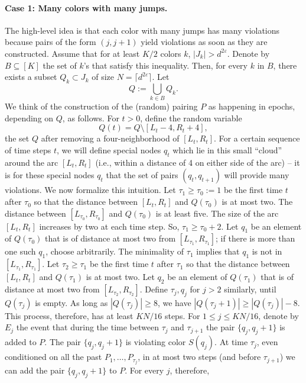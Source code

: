 \documentclass[10pt,a4paper]{article}
\begin{document}
\paragraph{Case 1: Many colors with many jumps.}
The high-level idea is that each color with many jumps has many violations because pairs of the form $(j,j+1)$ yield violations as soon as they are constructed.
Assume that for at least $K/2$ colors $k$, $|J_k|>d^{2\varepsilon}$. Denote by $B\subseteq[K]$ the set of $k$'s that satisfy this inequality. Then, for every $k$ in $B$, there exists a subset $Q_k\subset J_k$ of size $N=\lceil d^{2\varepsilon}\rceil$. Let
\[Q:=\bigcup_{k\in B}Q_k.\]
We think of the construction of the (random) pairing $P$ as happening in epochs, depending on $Q$, as follows.
For $t>0$, define the random variable
\[Q(t)=Q\setminus[L_t-4,R_t+4],\]
the set $Q$ after removing a four-neighborhood of $[L_t,R_t]$. For a certain sequence of time steps $t$, we will define special nodes $q_t$ which lie in this small ``cloud'' around the arc $[L_t,R_t]$ (i.e., within a distance of 4 on either side of the arc) -- it is for these special nodes $q_t$ that the set of pairs $(q_t,q_{t+1})$ will provide many violations. We now formalize this intuition.
Let $\tau_1\geq\tau_0:=1$ be the first time $t$ after $\tau_0$ so that the distance between $[L_t,R_t]$ and $Q(\tau_0)$ is at most two. The distance between $[L_{\tau_0},R_{\tau_0}]$ and $Q(\tau_0)$ is at least five. The size of the arc $[L_t,R_t]$ increases by two at each time step. So, $\tau_1\geq\tau_0+2$. Let $q_1$ be an element of $Q(\tau_0)$ that is of distance at most two from $[L_{\tau_1},R_{\tau_1}]$; if there is more than one such $q_1$, choose arbitrarily. The minimality of $\tau_1$ implies that $q_1$ is not in $[L_{\tau_1},R_{\tau_1}]$.
Let $\tau_2\geq\tau_1$ be the first time $t$ after $\tau_1$ so that the distance between $[L_t,R_t]$ and $Q(\tau_1)$ is at most two. Let $q_2$ be an element of $Q(\tau_1)$ that is of distance at most two from $[L_{\tau_2},R_{\tau_2}]$. Define $\tau_j,q_j$ for $j>2$ similarly, until $Q(\tau_j)$ is empty. As long as $|Q(\tau_j)|\geq8$, we have $|Q(\tau_j+1)|\geq|Q(\tau_j)|-8$. This process, therefore, has at least $KN/16$ steps. For $1\leq j\leq KN/16$, denote by $E_j$ the event that during the time between $\tau_j$ and $\tau_{j+1}$ the pair $\{q_j,q_j+1\}$ is added to $P$. The pair $\{q_j,q_j+1\}$ is violating color $S(q_j)$. At time $\tau_j$, even conditioned on all the past $P_1,\ldots,P_{\tau_j}$, in at most two steps (and before $\tau_{j+1}$) we can add the pair $\{q_j,q_j+1\}$ to $P$. For every $j$, therefore,
\end{document}
